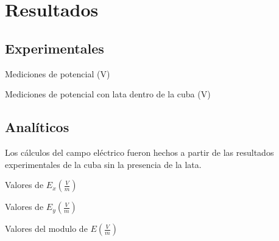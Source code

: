 \documentclass{article}
\begin{document}
\section{Resultados}
	\subsection{Experimentales}
		\begin{table}[H]
        \begin{adjustbox}{max width=\columnwidth}
        	
        \end{adjustbox}
        \caption{Mediciones de potencial (V)}
        \end{table}
    	\begin{table}[H]
        \begin{adjustbox}{max width=\columnwidth}
        	
        \end{adjustbox}
        \caption{Mediciones de potencial con lata dentro de la cuba (V)}
        \end{table}
    
    \subsection{Analíticos}
    Los cálculos del campo eléctrico fueron hechos a partir de las resultados experimentales de la cuba sin la presencia de la lata.
		\begin{table}[H]
        \begin{adjustbox}{max width=\columnwidth}
        	
        \end{adjustbox}
        \caption{Valores de $E_x \left(\frac{V}{m}\right)$}
        \end{table}
        
        \begin{table}[H]
        \begin{adjustbox}{max width=\columnwidth}
        	
        \end{adjustbox}
        \caption{Valores de $E_y \left(\frac{V}{m}\right)$}
        \end{table}
 
 		\begin{table}[H]
        \begin{adjustbox}{max width=\columnwidth}
        	
        \end{adjustbox}
        \caption{Valores del modulo de $E \left(\frac{V}{m}\right)$}
        \end{table}
        
\end{document}
